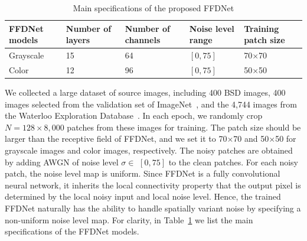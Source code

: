 \documentclass[journal]{IEEEtran}
\begin{document}
\begin{table}[!tbp]\footnotesize{}
\caption{Main specifications of the proposed FFDNet}
\center
\begin{tabular}{|p{1.1cm}<{\centering}|p{1.2cm}<{\centering}|p{1.3cm}<{\centering}|p{1.4cm}<{\centering}|p{1.4cm}<{\centering}|}
  \hline\rowcolor[gray]{.9}
  FFDNet models    & Number of layers   & Number of channels   & Noise level range   & Training patch size    \\ \hline
  Grayscale      & 15 &  64   & $[0, 75]$  & 70$\times$70    \\\hline
  Color      & 12  &  96  & $[0, 75]$  & 50$\times$50     \\
  \hline
\end{tabular}%
\label{table_network}
\end{table}







We collected a large dataset of source images, including 400 BSD images, 400 images selected from the validation set of ImageNet~\cite{deng2009imagenet}, and the 4,744 images from the Waterloo Exploration Database~\cite{ma2016gmad}.
In each epoch, we randomly crop $N = 128\times 8,000$ patches from these images for training.
The patch size should be larger than the receptive field of FFDNet, and we set it to 70$\times$70 and 50$\times$50 for grayscale images and color images, respectively. The noisy patches are obtained by adding AWGN of noise level $\sigma \in$ $[0, 75]$ to the clean patches.
For each noisy patch, the noise level map is uniform. Since FFDNet is a fully convolutional neural network, it inherits the local connectivity property that the output pixel is determined by the local noisy input and local noise level. Hence, the trained FFDNet naturally has the ability to handle spatially variant noise by specifying a non-uniform noise level map. For clarity, in Table~\ref{table_network} we list the main specifications of the FFDNet models.
\end{document}
